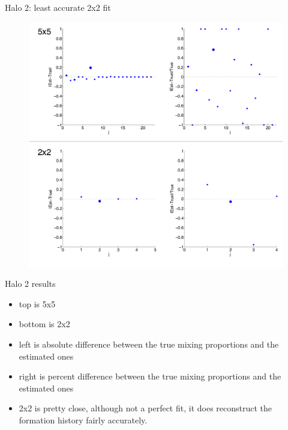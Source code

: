 \documentclass{beamer}
\begin{document}
\begin{frame}{Halo 2: least accurate 2x2 fit}	
	
	\begin{figure}
			\begin{center}
				\includegraphics[scale=0.22]{halo2pct2x25x5.pdf}
			\end{center}
	\end{figure}	
	
\end{frame}
\begin{frame}[shrink]{Halo 2 results}
	
	\begin{itemize}
		\item top is 5x5
		\item bottom is 2x2
		\item left is absolute difference between the true mixing proportions and the estimated ones
		\item right is percent difference between the true mixing proportions and the estimated ones
		\item 2x2 is pretty close, although not a perfect fit, it does reconstruct the formation history fairly accurately.
	\end{itemize}
	
\end{frame}
\end{document}
